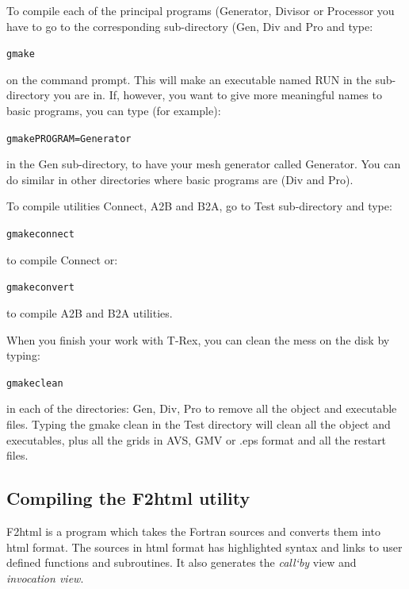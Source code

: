\documentclass[10pt]{article}
\newcommand*{\tc}{\ttfamily} %
\newcommand*{\tn}{\sffamily} %
\begin{document}
    To compile each of the principal programs ({\tn Generator}, 
    {\tn Divisor} or {\tn Processor} you have to go to the 
    corresponding sub-directory ({\tc Gen}, {\tc Div} and {\tc Pro}
    and type:
    \begin{alltt}
    gmake 
    \end{alltt}
    on the command prompt. This will make an executable named {\tc RUN}   
    in the sub-directory you are in. If, however, you want to give
    more meaningful names to basic programs, you can type 
    (for example):
    \begin{alltt}
    gmake PROGRAM=Generator 
    \end{alltt}
    in the {\tc Gen} sub-directory, to have your mesh generator
    called {\tc Generator}. You can do similar in other directories
    where basic programs are ({\tc Div} and {\tc Pro}).

    To compile utilities {\tn Connect}, {\tn A2B} and {\tn B2A},
    go to {\tc Test} sub-directory and type:
    \begin{alltt}
    gmake connect  
    \end{alltt}
    to compile {\tn Connect} or:
    \begin{alltt}
    gmake convert  
    \end{alltt}
    to compile {\tn A2B} and {\tn B2A} utilities. 

    When you finish your work with {\tn T-Rex}, you can clean
    the mess on the disk by typing:
    \begin{alltt}
    gmake clean  
    \end{alltt}
    in each of the directories: {\tc Gen}, {\tc Div}, {\tc Pro}
    to remove all the object and executable files. Typing 
    the {\tc gmake clean} in the {\tc Test} directory will
    clean all the object and executables, plus all the grids
    in AVS, GMV or .eps format and all the restart files. 

    \subsection{Compiling the {\tn F2html} utility}
    \label{Com}

    {\tn F2html} is a program which takes the Fortran sources
    and converts them into html format. The sources in html
    format has highlighted syntax and links to user defined
    functions and subroutines. It also generates the {\em call`by} 
    view and {\em invocation view}.
\end{document}
